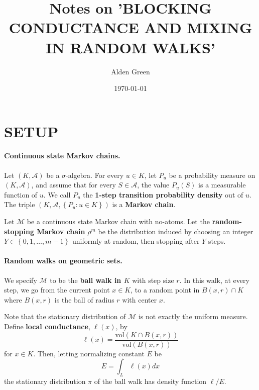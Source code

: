 \documentclass{article}
\newcommand{\vol}{\text{vol}}
\newcommand{\set}[1]{\left\{#1\right\}}
\newcommand{\A}{\mathcal{A}}
\theoremstyle{alden}
\theoremstyle{aldenthm}
\theoremstyle{definition}
\theoremstyle{remark}
\begin{document}
	
\title{Notes on 'BLOCKING CONDUCTANCE AND MIXING IN RANDOM WALKS'}
\author{Alden Green}
\date{\today}
\maketitle

\section{SETUP}

\paragraph{Continuous state Markov chains.}

Let $(K, \mathcal{A})$ be a $\sigma$-algebra. For every $u \in K$, let $P_u$ be a probability measure on $(K, \mathcal{A})$, and assume that for every $S \in \mathcal{A}$, the value $P_u(S)$ is a measurable function of $u$. We call $P_u$ the \textbf{1-step transition probability density} out of $u$. The triple $(K, \A, \set{P_u: u \in K})$ is a \textbf{Markov chain}.

Let $\mathcal{M}$ be a continuous state Markov chain with no-atoms. Let the \textbf{random-stopping Markov chain} $\rho^m$ be the distribution induced by choosing an integer $Y \in \set{0, 1, \ldots, m - 1}$ uniformly at random, then stopping after $Y$ steps. 

\paragraph{Random walks on geometric sets.}
We specify $\mathcal{M}$ to be the \textbf{ball walk in $K$} with step size $r$. In this walk, at every step, we go from the current point $x \in K$, to a random point in $B(x, r) \cap K$ where $B(x,r)$ is the ball of radius $r$ with center $x$. 

Note that the stationary distribution of $\mathcal{M}$ is not exactly the uniform measure. Define \textbf{local conductance}, $\ell(x)$, by
\begin{equation*}
\ell(x) = \frac{\vol(K \cap B(x,r))}{\vol(B(x,r))}
\end{equation*}
for $x \in K$. Then, letting normalizing constant $E$ be
\begin{equation*}
E = \int_{L} \ell(x) dx
\end{equation*}
the stationary distribution $\pi$ of the ball walk has density function $\ell/E$.
\end{document}
